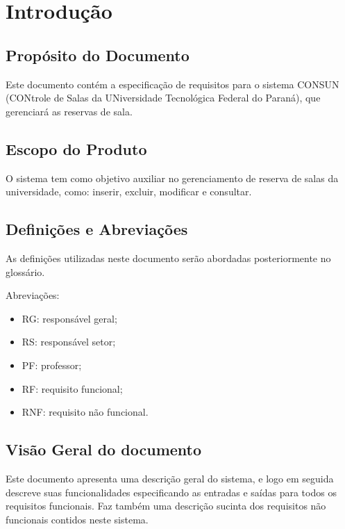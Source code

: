 \chapter{Introduç\~ao}

\section{Prop\'osito do Documento}
	Este documento cont\'em a especificaç\~ao de requisitos para o sistema CONSUN (CONtrole de Salas da UNiversidade Tecnol\'ogica Federal do Paran\'a), que gerenciará as reservas de sala.
	
\section{Escopo do Produto}
	O sistema tem como objetivo auxiliar no gerenciamento de reserva de salas da universidade, como: inserir, excluir, modificar e consultar.
	
\section{Definiç\~oes e Abreviaç\~oes}
	As definiç\~oes utilizadas neste documento ser\~ao abordadas posteriormente no gloss\'ario.	
	
	Abreviaç\~oes:	
		\begin{itemize}%
		    \item RG: respons\'avel geral;
		    \item RS: respons\'avel setor;
		    \item PF: professor;
			\item RF: requisito funcional;
			\item RNF: requisito n\~ao funcional.
		\end{itemize}	
		
		
\section{Vis\~ao Geral do documento}
	Este documento apresenta uma descriç\~ao geral do sistema, e logo em seguida descreve suas funcionalidades especificando as entradas e sa\'idas para todos os requisitos funcionais. Faz tamb\'em uma descriç\~ao sucinta dos requisitos n\~ao funcionais contidos neste sistema.
	

